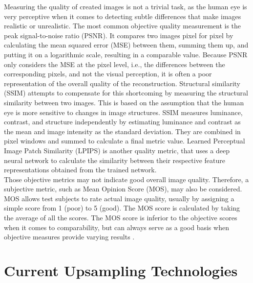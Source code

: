 \documentclass[letterpaper, 10 pt, conference]{ieeeconf}  %
\begin{document}
Measuring the quality of created images is not a trivial task, as the human eye is very perceptive when it comes to detecting subtle differences that make images realistic or unrealistic.
The most common objective quality measurement is the peak signal-to-noise ratio (PSNR). 
It compares two images pixel for pixel by calculating the mean squared error (MSE) between them, summing them up, and putting it on a logarithmic scale, resulting in a comparable value.
Because PSNR only considers the MSE at the pixel level, i.e., the differences between the corresponding pixels, and not the visual perception, it is often a poor representation of the overall quality of the reconstruction.
Structural similarity (SSIM) attempts to compensate for this shortcoming by measuring the structural similarity between two images. 
This is based on the assumption that the human eye is more sensitive to changes in image structures.
SSIM measures luminance, contrast, and structure independently by estimating luminance and contrast as the mean and image intensity as the standard deviation.
They are combined in pixel windows and summed to calculate a final metric value. 
Learned Perceptual Image Patch Similarity (LPIPS) is another quality metric, that uses a deep neural network to calculate the similarity between their respective feature representations obtained from the trained network.\\
Those objective metrics may not indicate good overall image quality. Therefore, a subjective metric, such as Mean Opinion Score (MOS), may also be considered.
MOS allows test subjects to rate actual image quality, usually by assigning a simple score from 1 (poor) to 5 (good).
The MOS score is calculated by taking the average of all the scores. 
The MOS score is inferior to the objective scores when it comes to comparability, but can always serve as a good basis when objective measures provide varying results \cite{wang2020deep} \cite{Soufi2022BenchmarkOD}.


\section{Current Upsampling Technologies}
\label{Sec:Current}
\end{document}
